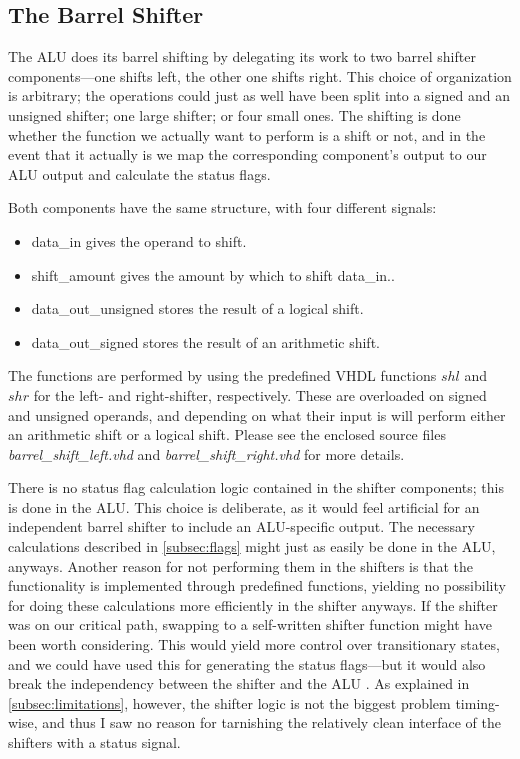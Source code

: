\documentclass{article}
\begin{document}
\subsection{The Barrel Shifter}
\label{subsec:barrelshifter}
The ALU does its barrel shifting by delegating its work to two barrel shifter components---one shifts left, the other one shifts right. This choice of organization is arbitrary; the operations could just as well have been split into a signed and an unsigned shifter; one large shifter; or four small ones. The shifting is done whether the function we actually want to perform is a shift or not, and in the event that it actually is we map the corresponding component's output to our ALU output and calculate the status flags. 

Both components have the same structure, with four different signals:
\begin{itemize}
\item data\_in gives the operand to shift.
\item shift\_amount gives the amount by which to shift data\_in..
\item data\_out\_unsigned stores the result of a logical shift.
\item data\_out\_signed stores the result of an arithmetic shift.
\end{itemize}

The functions are performed by using the predefined VHDL functions $shl$ and $shr$ for the left- and right-shifter, respectively. These are overloaded on signed and unsigned operands, and depending on what their input is will perform either an arithmetic shift or a logical shift. Please see the enclosed source files \emph{barrel\_shift\_left.vhd} and \emph{barrel\_shift\_right.vhd} for more details. 

There is no status flag calculation logic contained in the shifter components; this is done in the ALU. This choice is deliberate, as it would feel artificial for an independent barrel shifter to include an ALU-specific output. The necessary calculations described in \autoref{subsec:flags} might just as easily be done in the ALU, anyways. Another reason for not performing them in the shifters is that the functionality is implemented through predefined functions, yielding no  possibility for doing these calculations more efficiently in the shifter anyways. If the shifter was on our critical path, swapping to a self-written shifter function might have been worth considering. This would yield more control over transitionary states, and we could have used this for generating the status flags---but it would also break the independency between the shifter and the ALU . As explained in \autoref{subsec:limitations}, however, the shifter logic is not the biggest problem timing-wise, and thus I saw no reason for tarnishing the relatively clean interface of the shifters with a status signal.
\end{document}
